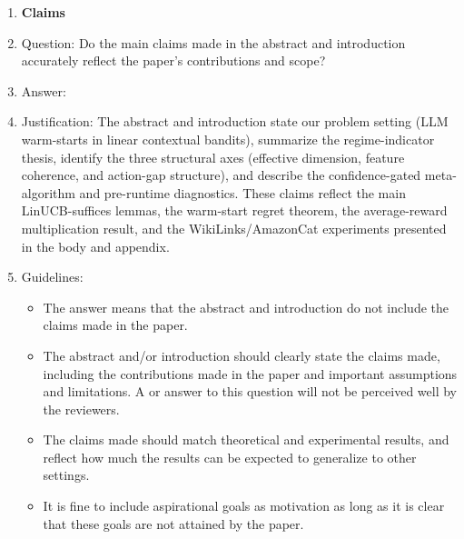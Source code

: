 \documentclass{article}
\theoremstyle{definition}
\theoremstyle{remark}
\theoremstyle{remark}
\begin{document}
\begin{enumerate}

\item {\bf Claims}
    \item[] Question: Do the main claims made in the abstract and introduction accurately reflect the paper's contributions and scope?
    \item[] Answer: \answerYes{} %
    \item[] Justification: The abstract and introduction state our problem setting (LLM warm-starts in linear contextual bandits), summarize the regime-indicator thesis, identify the three structural axes (effective dimension, feature coherence, and action-gap structure), and describe the confidence-gated meta-algorithm and pre-runtime diagnostics. These claims reflect the main LinUCB-suffices lemmas, the warm-start regret theorem, the average-reward multiplication result, and the WikiLinks/AmazonCat experiments presented in the body and appendix.
    \item[] Guidelines:
    \begin{itemize}
        \item The answer \answerNA{} means that the abstract and introduction do not include the claims made in the paper.
        \item The abstract and/or introduction should clearly state the claims made, including the contributions made in the paper and important assumptions and limitations. A \answerNo{} or \answerNA{} answer to this question will not be perceived well by the reviewers. 
        \item The claims made should match theoretical and experimental results, and reflect how much the results can be expected to generalize to other settings. 
        \item It is fine to include aspirational goals as motivation as long as it is clear that these goals are not attained by the paper. 
    \end{itemize}


\end{enumerate}
\end{document}
